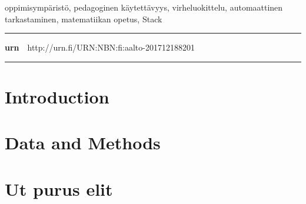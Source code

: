   \begin{spacing}{.88}
  {\parindent0pt %

  \parbox[t]{121.6mm}{\raggedright\small oppimisympäristö, pedagoginen käytettävyys, virheluokittelu, automaattinen tarkastaminen, matematiikan opetus, Stack}

  \vspace{.5mm}\rule{\textwidth}{.75pt}

  {\fontsize{10.5pt}{10.5pt}\bfseries\sffamily\lsstyle urn}~~{\small http://urn.fi/URN:NBN:fi:aalto-201712188201}

  \vspace{-2.4mm}\rule{\textwidth}{.75pt}

  } %
  \end{spacing}

  \restoregeometry  %




  \newpage

  \tableofcontents


  \newpage


  \chapter{Introduction}
  

  \chapter{Data and Methods}
  


  
  



  \appendix

  \chapter{Ut purus elit}

